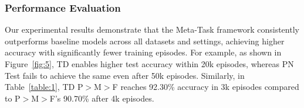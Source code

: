   \begin{table}[!htpb]
  \centering
  \caption{Comparison of few-shot classification accuracies (\%) with 95\% confidence intervals on the FC100 dataset \cite{oreshkin2018tadam2}. Results are reported for 5-way 1-shot and 5-way 5-shot settings. `PN' and `TD' refer to Prototypical Networks and Task-Decoder, respectively.}
  \label{table:2}
  \end{table}

\subsubsection{Performance Evaluation}

Our experimental results demonstrate that the Meta-Task framework consistently outperforms baseline models across all datasets and settings, achieving higher accuracy with significantly fewer training episodes. For example, as shown in Figure~\ref{fig:5}, TD enables higher test accuracy within 20k episodes, whereas PN Test fails to achieve the same even after 50k episodes. Similarly, in Table~\ref{table:1}, TD P$>$M$>$F reaches 92.30\% accuracy in 3k episodes compared to P$>$M$>$F's 90.70\% after 4k episodes.

